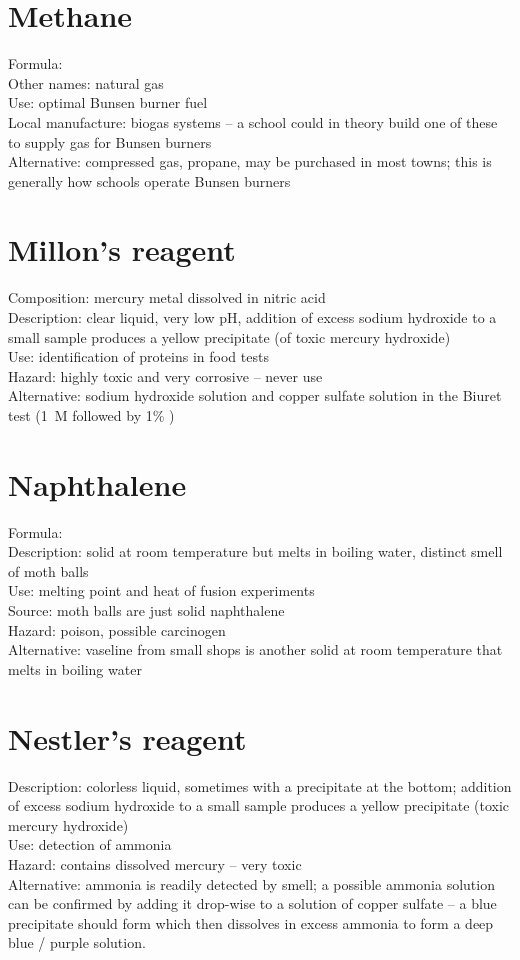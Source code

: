 \section{Methane}
Formula: \\
Other names: natural gas\\
Use: optimal Bunsen burner fuel\\
Local manufacture: biogas systems --
a school could in theory build one of these to supply gas for Bunsen burners\\
Alternative: compressed gas, 
propane, 
may be purchased in most towns; 
this is generally how schools operate Bunsen burners

\section{Millon's reagent}
Composition: mercury metal dissolved in nitric acid\\
Description: clear liquid, 
very low pH, 
addition of excess sodium hydroxide to a small sample 
produces a yellow precipitate (of toxic mercury hydroxide)\\
Use: identification of proteins in food tests\\
Hazard: highly toxic and very corrosive -- never use\\
Alternative: sodium hydroxide solution 
and copper sulfate solution in the Biuret test 
(1~M  followed by 1\% )

\section{Naphthalene}
Formula: \\
Description: solid at room temperature but melts in boiling water, 
distinct smell of moth balls\\
Use: melting point and heat of fusion experiments\\
Source: moth balls are just solid naphthalene\\
Hazard: poison, 
possible carcinogen\\
Alternative: vaseline from small shops is 
another solid at room temperature that melts in boiling water

\section{Nestler's reagent}
Description: colorless liquid, 
sometimes with a precipitate at the bottom; 
addition of excess sodium hydroxide to a small sample 
produces a yellow precipitate (toxic mercury hydroxide)\\
Use: detection of ammonia\\
Hazard: contains dissolved mercury -- very toxic\\
Alternative: ammonia is readily detected by smell; 
a possible ammonia solution can be confirmed by adding it drop-wise 
to a solution of copper sulfate -- 
a blue precipitate should form 
which then dissolves in excess ammonia to form a deep blue / purple solution.

